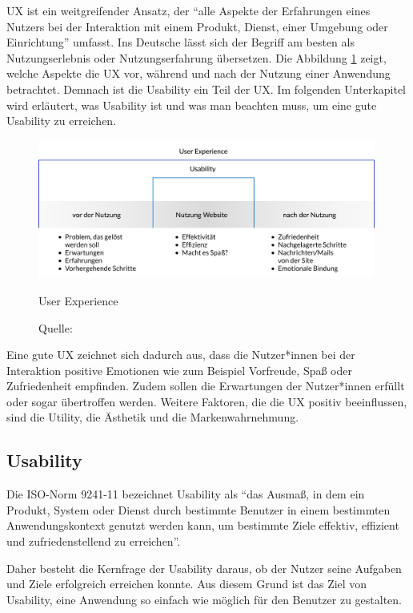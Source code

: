  \ac{UX} ist ein weitgreifender Ansatz, der \enquote{alle Aspekte der Erfahrungen eines Nutzers bei der Interaktion mit einem Produkt, Dienst, einer Umgebung oder Einrichtung} umfasst.
Ins Deutsche lässt sich der Begriff am besten als Nutzungserlebnis oder Nutzungserfahrung übersetzen. \citep[vgl.]{jacobsen_praxisbuch_2019}
Die Abbildung \ref{fig:abb2} zeigt, welche Aspekte die \ac{UX} vor, während und nach der Nutzung einer Anwendung betrachtet.
Demnach ist die Usability ein Teil der \ac{UX}.
Im folgenden Unterkapitel wird erläutert, was Usability ist und was man beachten muss, um eine gute Usability zu erreichen.

\begin{figure}[h]
	\centering
    	\includegraphics[width=0.99\textwidth]{Images/User_Experience.png}
   	\caption{User Experience}
	\caption*{\small Quelle: \cite{jacobsen_praxisbuch_2019}}
   	\label{fig:abb2}
\end{figure}

Eine gute \ac{UX} zeichnet sich dadurch aus, dass die Nutzer*innen bei der Interaktion positive Emotionen wie zum Beispiel Vorfreude, Spaß oder Zufriedenheit empfinden.
Zudem sollen die Erwartungen der Nutzer*innen erfüllt oder sogar übertroffen werden.
Weitere Faktoren, die die \ac{UX} positiv beeinflussen, sind die Utility, die Ästhetik und die Markenwahrnehmung. \citep[vgl.]{weichert_quick_2021}

\subsection{Usability}

Die ISO-Norm 9241-11 \citep{ISO_standard} bezeichnet Usability als \enquote{das Ausmaß, in dem ein Produkt, System oder Dienst durch bestimmte Benutzer in einem bestimmten Anwendungskontext genutzt werden kann, um bestimmte Ziele effektiv, effizient und zufriedenstellend zu erreichen}.

Daher besteht die Kernfrage der Usability daraus, ob der Nutzer seine Aufgaben und Ziele erfolgreich erreichen konnte.
Aus diesem Grund ist das Ziel von Usability, eine Anwendung so einfach wie möglich für den Benutzer zu gestalten. \citep[vgl.]{jacobsen_praxisbuch_2019}

